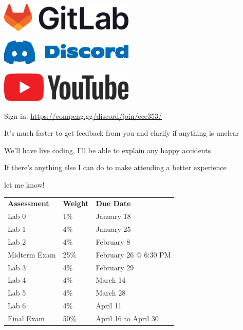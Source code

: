 \begin{slide}
  

  \begin{center}
    \includegraphics[width=64mm]{gitlab.eps}
    \bigskip

    \includegraphics[width=64mm]{discord.eps}
    \bigskip

    \includegraphics[width=64mm]{youtube.eps}
  \end{center}

  Sign in: \url{https://compeng.gg/discord/join/ece353/}
\end{slide}

\begin{slide}
  

  It's much faster to get feedback from you and clarify if anything is unclear
  \medskip

  We'll have live coding, I'll be able to explain any happy accidents
  \medskip

  If there's anything else I can do to make attending a better experience
  
  let me know!
\end{slide}

\begin{slide}
  

  \centering
  \begin{tabular}{lll}
      \textbf{Assessment} & \textbf{Weight} & \textbf{Due Date} \\
      Lab 0 & 1\% & January 18 \\
      Lab 1 & 4\% & January 25 \\
      Lab 2 & 4\% & February 8 \\
      Midterm Exam & 25\% & February 26 @ 6:30 PM \\
      Lab 3 & 4\% & February 29 \\
      Lab 4 & 4\% & March 14 \\
      Lab 5 & 4\% & March 28 \\
      Lab 6 & 4\% & April 11 \\
      Final Exam & 50\% & April 16 to April 30 \\
  \end{tabular}
\end{slide}

